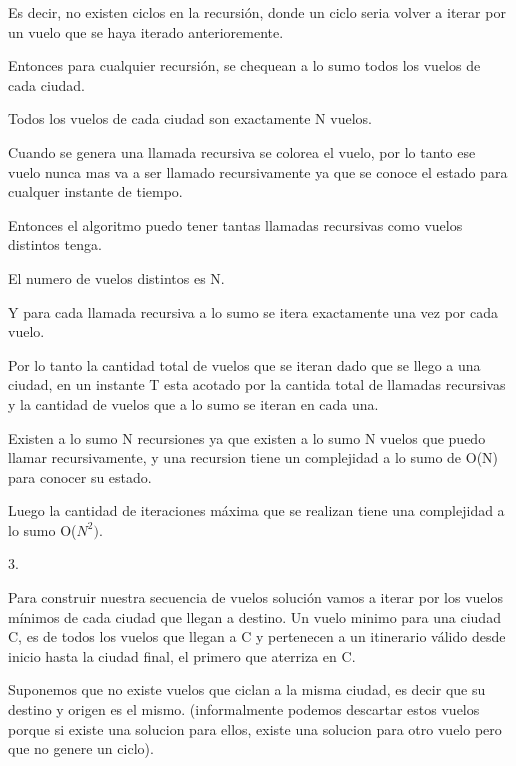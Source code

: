Es decir, no existen ciclos en la recursi\'on, donde un ciclo seria volver a iterar por un vuelo que se haya iterado anterioremente.

Entonces para cualquier recursi\'on, se chequean a lo sumo todos los vuelos de cada ciudad.

Todos los vuelos de cada ciudad son exactamente N vuelos.

Cuando se genera una llamada recursiva se colorea el vuelo, por lo tanto ese vuelo nunca mas va a ser llamado recursivamente ya que se conoce el estado para cualquer instante de tiempo.

Entonces el algoritmo puedo tener tantas llamadas recursivas como vuelos distintos tenga.

El numero de vuelos distintos es N.

Y para cada llamada recursiva a lo sumo se itera exactamente una vez por cada vuelo.

Por lo tanto la cantidad total de vuelos que se iteran dado que se llego a una ciudad, en un instante T esta acotado por la cantida total de llamadas recursivas y la cantidad de vuelos que a lo sumo se iteran en cada una.

Existen a lo sumo N recursiones ya que existen a lo sumo N vuelos que puedo llamar recursivamente, y una recursion tiene un complejidad a lo sumo de O(N) para conocer su estado.

Luego la cantidad de iteraciones m\'axima que se realizan tiene una complejidad a lo sumo O($N^{2})$.

3.

Para construir nuestra secuencia de vuelos soluci\'on vamos a iterar por los vuelos m\'inimos de cada ciudad que llegan a destino.
Un vuelo minimo para una ciudad C, es de todos los vuelos que llegan a C y pertenecen a un itinerario v\'alido desde inicio hasta la ciudad final, el primero que aterriza en C. 



Suponemos que no existe vuelos que ciclan a la misma ciudad, es decir que su destino y origen es el mismo. (informalmente podemos descartar estos vuelos porque si existe una solucion para ellos, existe una solucion para otro vuelo pero que no genere un ciclo).


